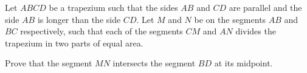 \documentclass[varwidth]{standalone}
\begin{document}
    Let $ABCD$ be a trapezium such that the sides $AB$ and $CD$ are parallel and the side $AB$ is longer than the side $CD$. Let $M$ and $N$ be on the segments $AB$ and $BC$ respectively, such that each of the segments $CM$ and $AN$ divides the trapezium in two parts of equal area.

    Prove that the segment $MN$ intersects the segment $BD$ at its midpoint.
\end{document}
